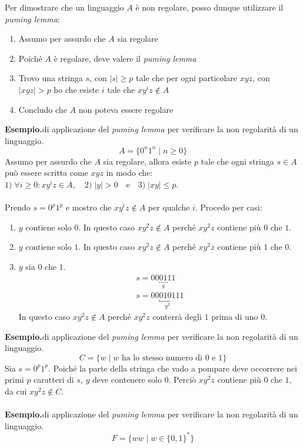 \documentclass[italian]{article}
\newcommand{\taleche}{\;|\;}
\newcommand{\example}{\noindent\textbf{Esempio.\quad}}
\begin{document}
Per dimostrare che un linguaggio $A$ è non regolare, posso dunque utilizzare il \textit{puming lemma}:
\begin{enumerate}
	\item Assumo per assurdo che $A$ sia regolare
	\item Poiché $A$ è regolare, deve valere il \textit{puming lemma}
	\item Trovo una stringa $s$, con $|s| \geq p$ tale che per ogni particolare $xyz$, con $|xyz|>p$ ho che esiste $i$ tale che $xy^iz \notin A$
	\item Concludo che $A$ non poteva essere regolare
\end{enumerate}
\pagebreak
\example di applicazione del \textit{puming lemma} per verificare la non regolarità di un linguaggio.
\[
	A = \{ 0^n1^n \taleche n \geq 0 \}
\]
Assumo per assurdo che $A$ sia regolare, allora esiste $p$ tale che ogni stringa $s \in A$ può essere scritta come $xyz$ in modo che: $1)\; \forall i \geq 0: xy^iz \in A, \quad 2)\; |y| > 0\quad \text{e}\quad 3)\; |xy| \leq p$. \\\\
Prendo $s = 0^p1^p$ e mostro che $xy^iz \notin A$ per qualche $i$. Procedo per casi:
\begin{enumerate}
	\item $y$ contiene solo $0$. In questo caso $xy^2z \notin A$ perché $xy^2z$ contiene più $0$ che $1$.
	\item $y$ contiene solo $1$. In questo caso $xy^2z \notin A$ perché $xy^2z$ contiene più $1$ che $0$.
	\item $y$ sia $0$ che $1$. 
	\begin{gather*}
		s = 00\underbracket{01}_{y}11 \\
		s = 00\underbracket{0101}_{y^2}11
	\end{gather*}
	In questo caso $xy^2z \notin A$ perché $xy^2z$ conterrà degli $1$ prima di uno $0$.
\end{enumerate}
\example di applicazione del \textit{puming lemma} per verificare la non regolarità di un linguaggio.
\[
	C = \{ w \taleche w \text{ ha lo stesso numero di 0 e 1} \}
\]
Sia $s = 0^p1^p$. Poiché la parte della stringa che vado a pompare deve occorrere nei primi $p$ caratteri di $s$, $y$ deve contenere solo $0$. Perciò $xy^2z$ contiene più $0$ che $1$, da cui $xy^2z \notin C$.\\\\
\example di applicazione del \textit{puming lemma} per verificare la non regolarità di un linguaggio.
\[
	F = \{ ww \taleche w \in \{0,1\}^* \}
\]
\end{document}
